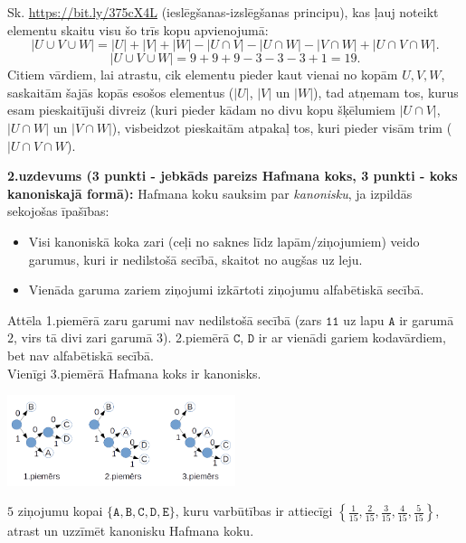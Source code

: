 \documentclass[a4paper,12pt]{article}
\begin{document}
{Sk. \url{https://bit.ly/375cX4L} (ieslēgšanas-izslēgšanas principu),
kas ļauj noteikt elementu skaitu visu šo trīs kopu apvienojumā:
\[ \left| U \cup V \cup W \right| = \left| U \right| + \left| V \right| + \left| W \right| -
\left| U \cap V \right| - \left| U \cap W \right| - \left| V \cap W \right| + \left| U \cap V \cap W \right|. \]
\[ \left| U \cup V \cup W \right| = 9+9+9 - 3 - 3 - 3+1 = 19. \]
Citiem vārdiem, lai atrastu, cik elementu pieder kaut vienai no kopām $U,V,W$, saskaitām
šajās kopās esošos elementus ($|U|$, $|V|$ un $|W|$), tad atņemam tos, kurus esam pieskaitījuši
divreiz (kuri pieder kādam no divu kopu šķēlumiem
$|U \cap V|$, $|U \cap W|$ un $|V \cap W|$), visbeidzot pieskaitām atpakaļ
tos, kuri pieder visām trim ($|U \cap V \cap W$).

}




\vspace{6pt}
\noindent
{\bf 2.uzdevums (3 punkti - jebkāds pareizs Hafmana koks, 3 punkti - koks kanoniskajā formā):}
Hafmana koku sauksim par {\em kanonisku}, ja izpildās sekojošas īpašības: 
\begin{itemize}
\item Visi kanoniskā koka zari (ceļi no saknes līdz lapām/ziņojumiem) veido garumus, kuri ir nedilstošā secībā, skaitot no augšas uz leju.
\item Vienāda garuma zariem ziņojumi izkārtoti ziņojumu alfabētiskā secībā. 
\end{itemize}
Attēla 1.piemērā zaru garumi nav nedilstošā secībā
(zars $\mathtt{11}$ uz lapu $\mathtt{A}$ ir garumā $2$, virs tā divi zari garumā $3$). 
2.piemērā $\mathtt{C}$, $\mathtt{D}$ ir ar vienādi gariem kodavārdiem, bet nav alfabētiskā secībā.\\
Vienīgi 3.piemērā Hafmana koks ir kanonisks.

\begin{center}
\includegraphics[width=0.5\textwidth]{fall2019-midterm/huffman-examples.png}
\end{center}

$5$ ziņojumu kopai $\{ \mathtt{A},\mathtt{B},\mathtt{C},\mathtt{D},\mathtt{E} \}$, kuru varbūtības ir attiecīgi 
${\displaystyle \left\{ \frac{1}{15}, \frac{2}{15},\frac{3}{15},\frac{4}{15},\frac{5}{15} \right\}}$,
atrast un uzzīmēt kanonisku Hafmana koku.
\end{document}
